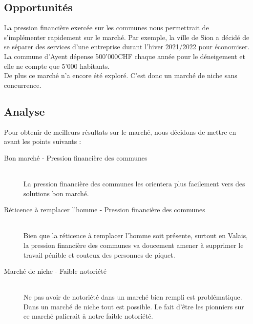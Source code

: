 \subsection{Opportunités}
La pression financière exercée sur les communes nous permettrait de s'implémenter rapidement
sur le marché. Par exemple, la ville de Sion a décidé de se séparer des services d'une entreprise
durant l'hiver 2021/2022 pour économiser. La commune d'Ayent dépense 500'000CHF chaque année pour
le déneigement et elle ne compte que 5'000 habitants.\\
De plus ce marché n'a encore été exploré. C'est donc un marché de niche sans concurrence.

\subsection{Analyse}
Pour obtenir de meilleurs résultats sur le marché, nous décidons de mettre en avant les points suivants :
\begin{description}
    \item[Bon marché - Pression financière des communes] \hfill \\
    La pression financière des communes les orientera plus facilement vers des solutions
    bon marché. 
    \item[Réticence à remplacer l'homme - Pression financière des communes] \hfill \\
    Bien que la réticence à remplacer l'homme soit présente, surtout en Valais, la pression
    financière des communes va doucement amener à supprimer le travail pénible et couteux des personnes de piquet.
    \item[Marché de niche - Faible notoriété] \hfill \\ 
    Ne pas avoir de notoriété dans un marché bien rempli est problématique. Dans un marché de niche
    tout est possible. Le fait d'être les pionniers sur ce marché palierait à notre faible notoriété.
\end{description}

